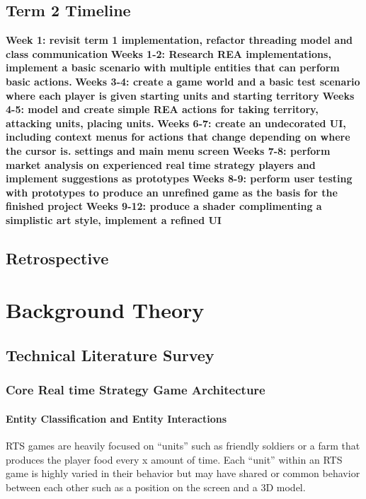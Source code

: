 \documentclass[]{final_report}
\begin{document}
\section{Term 2 Timeline}
\textbf{Week 1: revisit term 1 implementation, refactor threading model and class communication} \newline
\textbf{Weeks 1-2: Research REA implementations, implement a basic scenario with multiple entities that can perform basic actions. } \newline
\textbf{Weeks 3-4: create a game world and a basic test scenario where each player is given starting units and starting territory} \newline
\textbf{Weeks 4-5: model and create simple REA actions for taking territory, attacking units, placing units.} \newline
\textbf{Weeks 6-7: create an undecorated UI, including context menus for actions that change depending on where the cursor is. settings and main menu screen} \newline
\textbf{Weeks 7-8: perform market analysis on experienced real time strategy players and implement suggestions as prototypes} \newline
\textbf{Weeks 8-9: perform user testing with prototypes to produce an unrefined game as the basis for the finished project} \newline
\textbf{Weeks 9-12: produce a shader complimenting a simplistic art style, implement a refined UI} \newline
\section{Retrospective}

\newpage
\chapter{Background Theory}
\section{Technical Literature Survey}
\subsection{Core Real time Strategy Game Architecture}
\subsubsection{Entity Classification and Entity Interactions}
RTS games are heavily focused on “units” such as friendly soldiers or a farm that produces the player food every x amount of time. Each “unit” within an RTS game is highly varied in their behavior but may have shared or common behavior between each other such as a position on the screen and a 3D model. \newline
\end{document}
